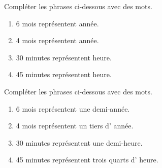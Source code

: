 \begin{exercice*}        
    Compléter les phrases ci-dessous avec des mots.
    \begin{enumerate}
       \item 6 mois représentent \makebox[0.3\linewidth]{\dotfill} année.
       \item 4 mois représentent \makebox[0.3\linewidth]{\dotfill} année.
       \item 30 minutes représentent \makebox[0.3\linewidth]{\dotfill} heure.
       \item 45 minutes représentent \makebox[0.3\linewidth]{\dotfill} heure.
    \end{enumerate}
\end{exercice*}
\begin{corrige}
    Compléter les phrases ci-dessous avec des mots.

    \begin{enumerate}
       \item 6 mois représentent        {\red une demi-}année.
       \item 4 mois représentent        {\red un tiers d'} année.
       \item 30 minutes représentent    {\red une demi-}heure.
       \item 45 minutes représentent    {\red trois quarts d'} heure.
    \end{enumerate}
\end{corrige}
    
    